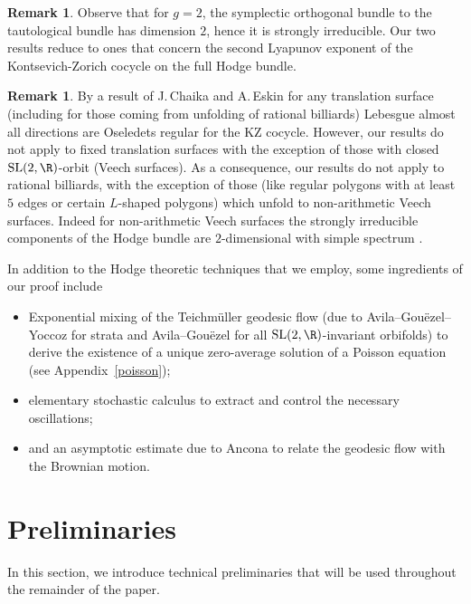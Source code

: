 \documentclass[10pt]{amsart}
\theoremstyle{plain}
\theoremstyle{definition}
\newtheorem{rem}[thm]{Remark}
\numberwithin{equation}{subsection}
\newcommand{\SL}{\mathrm{SL}}
\newcommand{\Tm}{Teichmüller\xspace}
\begin{document}
\begin{rem}
Observe that for $g=2$, the symplectic orthogonal bundle to the tautological bundle has dimension $2$, hence it is strongly irreducible. Our two results reduce to ones that concern the second Lyapunov exponent of the Kontsevich-Zorich cocycle on the full Hodge bundle.
\end{rem}

\begin{rem}
By a result of J.\,Chaika and A.\,Eskin \cite{CE13} for any translation surface (including for those coming from unfolding of rational billiards) Lebesgue almost all directions are Oseledets regular for the KZ cocycle. However, our results do not apply to fixed translation surfaces with the exception of those with closed $\SL(2, \R)$-orbit (Veech surfaces). As a consequence, our results do not apply to rational billiards, with the exception of those (like regular polygons with at least $5$ edges or certain $L$-shaped polygons) which unfold to non-arithmetic Veech surfaces. Indeed for non-arithmetic Veech surfaces the strongly irreducible components of the Hodge bundle are $2$-dimensional with simple spectrum \cite{Mol06}.
\end{rem}

In addition to the Hodge theoretic techniques that we employ, some ingredients of our proof include

\begin{itemize}
\item Exponential mixing of the \Tm geodesic flow (due to Avila--Gouëzel--Yoccoz \cite{AGY06} for strata and Avila--Gouëzel \cite{AG13} for all $\SL(2,\R)$-invariant orbifolds) to derive the existence of a unique zero-average solution of a Poisson equation (see
Appendix~\ref{poisson});
\item elementary stochastic calculus to extract and control the necessary oscillations;
\item and an asymptotic estimate due to Ancona \cite{Anc90} to relate the geodesic flow with the Brownian motion.
\end{itemize}

\section{Preliminaries}

In this section, we introduce technical preliminaries that will be used throughout the remainder of the paper.
\end{document}

